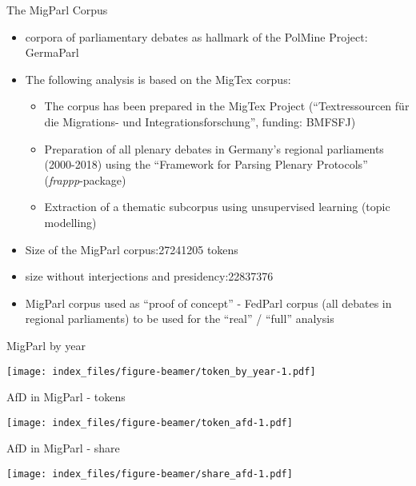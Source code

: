 \documentclass[
  ignorenonframetext,
]{beamer}
\providecommand{\tightlist}{%
  \setlength{\itemsep}{0pt}\setlength{\parskip}{0pt}}
\begin{document}
\begin{frame}{The MigParl Corpus}
\protect\hypertarget{the-migparl-corpus}{}

\begin{itemize}
\item
  corpora of parliamentary debates as hallmark of the PolMine Project:
  GermaParl
\item
  The following analysis is based on the MigTex corpus:

  \begin{itemize}
  \tightlist
  \item
    The corpus has been prepared in the MigTex Project (``Textressourcen
    für die Migrations- und Integrationsforschung'', funding: BMFSFJ)
  \item
    Preparation of all plenary debates in Germany's regional parliaments
    (2000-2018) using the ``Framework for Parsing Plenary Protocols''
    (\emph{frappp}-package)
  \item
    Extraction of a thematic subcorpus using unsupervised learning
    (topic modelling)
  \end{itemize}
\item
  Size of the MigParl corpus:27241205 tokens
\item
  size without interjections and presidency:22837376
\item
  MigParl corpus used as ``proof of concept'' - FedParl corpus (all
  debates in regional parliaments) to be used for the ``real'' /
  ``full'' analysis
\end{itemize}

\end{frame}

\begin{frame}{MigParl by year}
\protect\hypertarget{migparl-by-year}{}

\texttt{[image: index\_files/figure-beamer/token\_by\_year-1.pdf]}

\end{frame}

\begin{frame}{AfD in MigParl - tokens}
\protect\hypertarget{afd-in-migparl---tokens}{}

\texttt{[image: index\_files/figure-beamer/token\_afd-1.pdf]}

\end{frame}

\begin{frame}{AfD in MigParl - share}
\protect\hypertarget{afd-in-migparl---share}{}

\texttt{[image: index\_files/figure-beamer/share\_afd-1.pdf]}

\end{frame}
\end{document}
